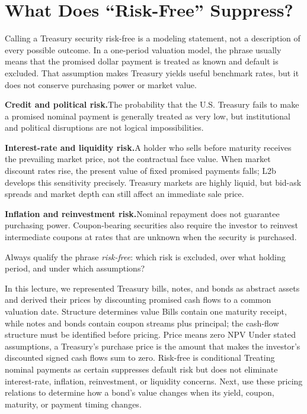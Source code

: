 \documentclass[11pt]{article}
\begin{document}
\section{What Does ``Risk-Free'' Suppress?}

Calling a Treasury security risk-free is a modeling statement, not a description of every possible outcome. In a one-period valuation model, the phrase usually means that the promised dollar payment is treated as known and default is excluded. That assumption makes Treasury yields useful benchmark rates, but it does not conserve purchasing power or market value.

\textbf{Credit and political risk.}\enspace The probability that the U.S. Treasury fails to make a promised nominal payment is generally treated as very low, but institutional and political disruptions are not logical impossibilities.

\textbf{Interest-rate and liquidity risk.}\enspace A holder who sells before maturity receives the prevailing market price, not the contractual face value. When market discount rates rise, the present value of fixed promised payments falls; L2b develops this sensitivity precisely. Treasury markets are highly liquid, but bid-ask spreads and market depth can still affect an immediate sale price.

\textbf{Inflation and reinvestment risk.}\enspace Nominal repayment does not guarantee purchasing power. Coupon-bearing securities also require the investor to reinvest intermediate coupons at rates that are unknown when the security is purchased.

Always qualify the phrase \emph{risk-free}: which risk is excluded, over what holding period, and under which assumptions?

\keytakeaways
  {In this lecture, we represented Treasury bills, notes, and bonds as abstract assets and derived their prices by discounting promised cash flows to a common valuation date.}
  {Structure determines value}
  {Bills contain one maturity receipt, while notes and bonds contain coupon streams plus principal; the cash-flow structure must be identified before pricing.}
  {Price means zero NPV}
  {Under stated assumptions, a Treasury's purchase price is the amount that makes the investor's discounted signed cash flows sum to zero.}
  {Risk-free is conditional}
  {Treating nominal payments as certain suppresses default risk but does not eliminate interest-rate, inflation, reinvestment, or liquidity concerns.}
  {Next, use these pricing relations to determine how a bond's value changes when its yield, coupon, maturity, or payment timing changes.}
\end{document}
